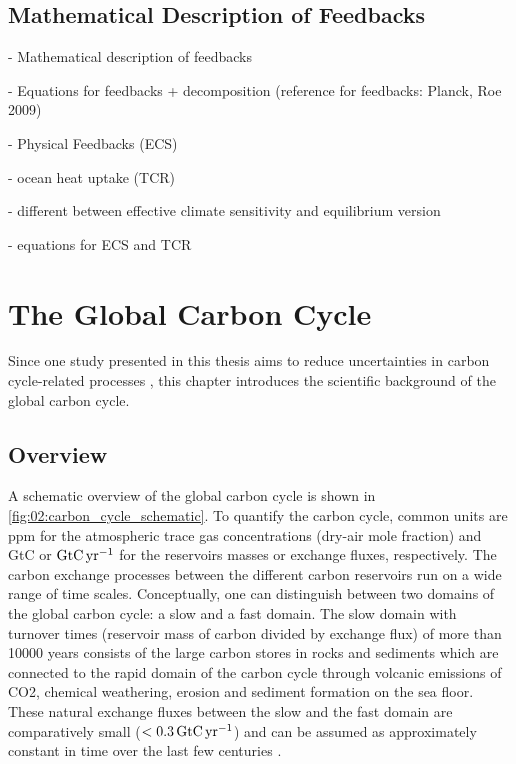 \subsection{Mathematical Description of Feedbacks}
\label{subsec:02:mathematics_of_feedbacks}

- Mathematical description of feedbacks

- Equations for feedbacks + decomposition (reference for feedbacks: Planck, Roe
2009)

- Physical Feedbacks (ECS)

- ocean heat uptake (TCR)

- different between effective climate sensitivity and equilibrium version

- equations for ECS and TCR


\section{The Global Carbon Cycle}
\label{sec:02:carbon_cycle}

Since one study presented in this thesis aims to reduce uncertainties in carbon
cycle-related processes ,
this chapter introduces the scientific background of the global carbon cycle.


\subsection{Overview}
\label{subsec:02:carbon_cycle_overview}

A schematic overview of the global carbon cycle is shown in
\cref{fig:02:carbon_cycle_schematic}. To quantify the carbon cycle, common
units are \ac{ppm} for the atmospheric trace gas concentrations (dry-air mole
fraction) and \ac{GtC} or $\si{\GtCyr{}}$ for the reservoirs masses or exchange
fluxes, respectively. The carbon exchange processes between the different
carbon reservoirs run on a wide range of time scales. Conceptually, one can
distinguish between two domains of the global carbon cycle: a slow and a fast
domain. The slow domain with turnover times (reservoir mass of carbon divided
by exchange flux) of more than 10000 years consists of the large carbon stores
in rocks and sediments which are connected to the rapid domain of the carbon
cycle through volcanic emissions of \ac{CO2}, chemical weathering, erosion and
sediment formation on the sea floor. These natural exchange fluxes between the
slow and the fast domain are comparatively small ($< 0.3 \unit{\GtCyr{}}$) and
can be assumed as approximately constant in time over the last few centuries
\autocite{Ciais2013}.

